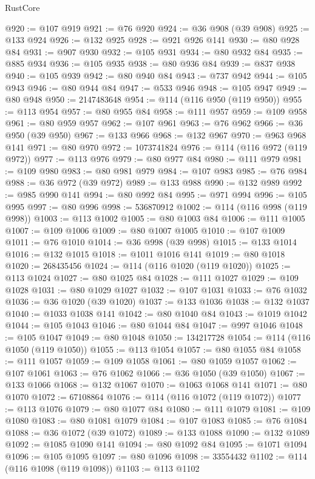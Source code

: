 \begin{lexlean}{RustCore}
\begin{coremodule}
@920 := @107 @919
@921 := @76 @920
@924 := @36 @908 (@39 @908)
@925 := @133 @924
@926 := @132 @925
@928 := @921 @926 @141
@930 := @80 @928 @84
@931 := @907 @930
@932 := @105 @931
@934 := @80 @932 @84
@935 := @885 @934
@936 := @105 @935
@938 := @80 @936 @84
@939 := @837 @938
@940 := @105 @939
@942 := @80 @940 @84
@943 := @737 @942
@944 := @105 @943
@946 := @80 @944 @84
@947 := @533 @946
@948 := @105 @947
@949 := @80 @948
@950 := 2147483648
@954 := @114 (@116 @950 (@119 @950))
@955 := @113 @954
@957 := @80 @955 @84
@958 := @111 @957
@959 := @109 @958
@961 := @80 @959 @957
@962 := @107 @961
@963 := @76 @962
@966 := @36 @950 (@39 @950)
@967 := @133 @966
@968 := @132 @967
@970 := @963 @968 @141
@971 := @80 @970
@972 := 1073741824
@976 := @114 (@116 @972 (@119 @972))
@977 := @113 @976
@979 := @80 @977 @84
@980 := @111 @979
@981 := @109 @980
@983 := @80 @981 @979
@984 := @107 @983
@985 := @76 @984
@988 := @36 @972 (@39 @972)
@989 := @133 @988
@990 := @132 @989
@992 := @985 @990 @141
@994 := @80 @992 @84
@995 := @971 @994
@996 := @105 @995
@997 := @80 @996
@998 := 536870912
@1002 := @114 (@116 @998 (@119 @998))
@1003 := @113 @1002
@1005 := @80 @1003 @84
@1006 := @111 @1005
@1007 := @109 @1006
@1009 := @80 @1007 @1005
@1010 := @107 @1009
@1011 := @76 @1010
@1014 := @36 @998 (@39 @998)
@1015 := @133 @1014
@1016 := @132 @1015
@1018 := @1011 @1016 @141
@1019 := @80 @1018
@1020 := 268435456
@1024 := @114 (@116 @1020 (@119 @1020))
@1025 := @113 @1024
@1027 := @80 @1025 @84
@1028 := @111 @1027
@1029 := @109 @1028
@1031 := @80 @1029 @1027
@1032 := @107 @1031
@1033 := @76 @1032
@1036 := @36 @1020 (@39 @1020)
@1037 := @133 @1036
@1038 := @132 @1037
@1040 := @1033 @1038 @141
@1042 := @80 @1040 @84
@1043 := @1019 @1042
@1044 := @105 @1043
@1046 := @80 @1044 @84
@1047 := @997 @1046
@1048 := @105 @1047
@1049 := @80 @1048
@1050 := 134217728
@1054 := @114 (@116 @1050 (@119 @1050))
@1055 := @113 @1054
@1057 := @80 @1055 @84
@1058 := @111 @1057
@1059 := @109 @1058
@1061 := @80 @1059 @1057
@1062 := @107 @1061
@1063 := @76 @1062
@1066 := @36 @1050 (@39 @1050)
@1067 := @133 @1066
@1068 := @132 @1067
@1070 := @1063 @1068 @141
@1071 := @80 @1070
@1072 := 67108864
@1076 := @114 (@116 @1072 (@119 @1072))
@1077 := @113 @1076
@1079 := @80 @1077 @84
@1080 := @111 @1079
@1081 := @109 @1080
@1083 := @80 @1081 @1079
@1084 := @107 @1083
@1085 := @76 @1084
@1088 := @36 @1072 (@39 @1072)
@1089 := @133 @1088
@1090 := @132 @1089
@1092 := @1085 @1090 @141
@1094 := @80 @1092 @84
@1095 := @1071 @1094
@1096 := @105 @1095
@1097 := @80 @1096
@1098 := 33554432
@1102 := @114 (@116 @1098 (@119 @1098))
@1103 := @113 @1102

\end{coremodule}
\end{lexlean}
